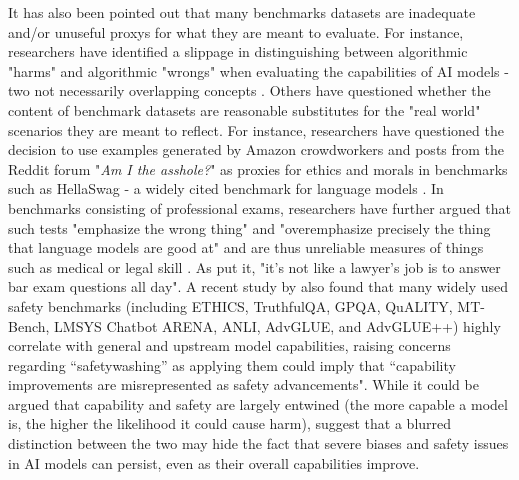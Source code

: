 It has also been pointed out that many benchmarks datasets are inadequate and/or unuseful proxys for what they are meant to evaluate. For instance, researchers have identified a slippage in distinguishing between algorithmic "harms" and algorithmic "wrongs" when evaluating the capabilities of AI models - two not necessarily overlapping concepts \cite{diberardino2024}. Others have questioned whether the content of benchmark datasets are reasonable substitutes for the "real world" scenarios they are meant to reflect. For instance, researchers have 
questioned the decision to use examples generated by Amazon crowdworkers and posts from the Reddit forum "\textit{Am I the asshole?}" as proxies for ethics and morals in benchmarks such as HellaSwag - a widely cited benchmark for language models \cite{keegan2024}. In benchmarks consisting of professional exams, researchers have further argued that such tests "emphasize the wrong thing" and "overemphasize precisely the thing that language models are good at" and are thus unreliable measures of things such as medical or legal skill \cite[n.p]{narayanan2023}.
As \citet{narayanan2023} put it, %
"it's not like a lawyer's job is to answer bar exam questions all day". 
A recent study by \citet{ren2024} also found that many widely used safety benchmarks (including ETHICS, TruthfulQA, GPQA, QuALITY, MT-Bench, LMSYS Chatbot ARENA, ANLI, AdvGLUE, and AdvGLUE++) 
highly correlate with general and upstream model capabilities, raising concerns regarding “safetywashing” as applying them could imply that “capability improvements are misrepresented as safety advancements". While it could be argued that capability and safety are largely entwined (the more capable a model is, the higher the likelihood it could cause harm), \citet[p.~1]{ren2024} suggest that a blurred distinction between the two may hide the fact that severe biases and safety issues in AI models can persist, even as their overall capabilities improve. 

